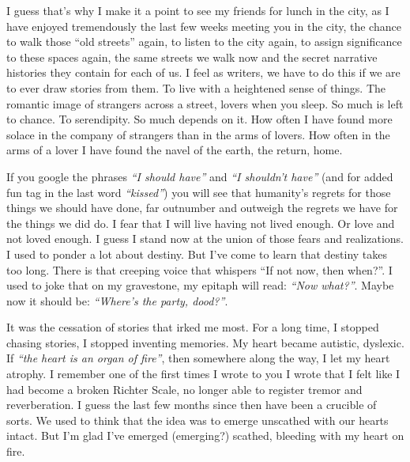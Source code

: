 \documentclass[11pt]{letter}
\begin{document}
I guess that’s why I make it a point to see my friends for lunch in the city, as
I have enjoyed tremendously the last few weeks meeting you in the city, the
chance to walk those “old streets” again, to listen to the city again, to assign
significance to these spaces again, the same streets we walk now and the secret
narrative histories they contain for each of us. I feel as writers, we have to
do this if we are to ever draw stories from them. To live with a heightened
sense of things. The romantic image of strangers across a street, lovers when
you sleep. So much is left to chance. To serendipity. So much depends on it. How
often I have found more solace in the company of strangers than in the arms of
lovers. How often in the arms of a lover I have found the navel of the earth,
the return, home.

If you google the phrases \emph{“I should have”} and \emph{“I shouldn’t have”} (and for added
fun tag in the last word \emph{“kissed”}) you will see that humanity’s regrets for
those things we should have done, far outnumber and outweigh the regrets we have
for the things we did do. I fear that I will live having not lived enough. Or
love and not loved enough. I guess I stand now at the union of those fears and
realizations. I used to ponder a lot about destiny. But I’ve come to learn that
destiny takes too long. There is that creeping voice that whispers “If not now,
then when?”. I used to joke that on my gravestone, my epitaph will read: \emph{“Now
what?”}. Maybe now it should be: \emph{“Where’s the party, dood?”}.

It was the cessation of stories that irked me most. For a long time, I stopped
chasing stories, I stopped inventing memories. My heart became autistic,
dyslexic. If \emph{“the heart is an organ of fire”}, then somewhere along the way, I
let my heart atrophy. I remember one of the first times I wrote to you I wrote
that I felt like I had become a broken Richter Scale, no longer able to register
tremor and reverberation. I guess the last few months since then have been a
crucible of sorts. We used to think that the idea was to emerge unscathed with
our hearts intact. But I’m glad I’ve emerged (emerging?) scathed, bleeding with
my heart on fire.
\end{document}

